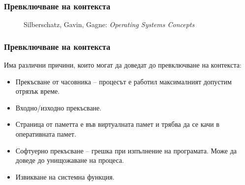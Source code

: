 \documentclass[ignorenonframetext, hyperref=unicode]{beamer}
\begin{document}
\begin{frame}\frametitle{Превключване на контекста}
\begin{figure}[h]
\center
{}
\caption{Silberschatz, Gavin, Gagne: {\em Operating Systems Concepts}}
\end{figure}
\end{frame}

\begin{frame}\frametitle{Превключване на контекста}
Има различни причини, които могат да доведат до превключване на контекста:
\begin{itemize}
\item Прекъсване от часовника -- процесът е работил максималният допустим
отрязък време.
\item Входно/изходно прекъсване.
\item Страница от паметта е във виртуалната памет и трябва да се качи в
оперативната памет.
\item Софтуерно прекъсване -- грешка при изпълнение на програмата. Може да доведе
до унищожаване на процеса.
\item Извикване на системна функция.
\end{itemize}
\end{frame}
\end{document}
